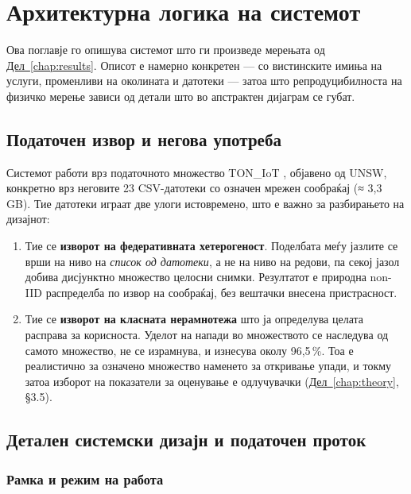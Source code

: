 \chapter{Архитектурна логика на системот}
\label{chap:system}

Ова поглавје го опишува системот што ги произведе мерењата од \hyperref[chap:results]{Дел~\ref*{chap:results}}. Описот е
намерно конкретен --- со вистинските имиња на услуги, променливи на околината и датотеки --- затоа што репродуцибилноста на физичко мерење зависи од детали што во апстрактен дијаграм
се губат.

\section{Податочен извор и негова употреба}

Системот работи врз податочното множество TON\_IoT \cite{moustafa2021toniot}, објавено од
UNSW, конкретно врз неговите 23 CSV-датотеки со означен мрежен сообраќај (≈ 3,3 GB). Тие
датотеки играат две улоги истовремено, што е важно за разбирањето на дизајнот:

\begin{enumerate}
  \item Тие се \textbf{изворот на федеративната хетерогеност}. Поделбата меѓу јазлите се врши на ниво на \emph{список од датотеки}, а не на ниво на редови, па секој јазол добива дисјунктно множество целосни снимки. Резултатот е природна non-IID распределба по извор на сообраќај, без вештачки внесена пристрасност.
  \item Тие се \textbf{изворот на класната нерамнотежа} што ја определува целата расправа за корисноста. Уделот на напади во множеството се наследува од самото множество, не се израмнува, и изнесува околу 96,5\,\%. Тоа е реалистично за означено множество наменето за откривање упади, и токму затоа изборот на показатели за оценување е одлучувачки (\hyperref[chap:theory]{Дел~\ref*{chap:theory}}, §3.5).
\end{enumerate}

\section{Детален системски дизајн и податочен проток}

\subsection{Рамка и режим на работа}

